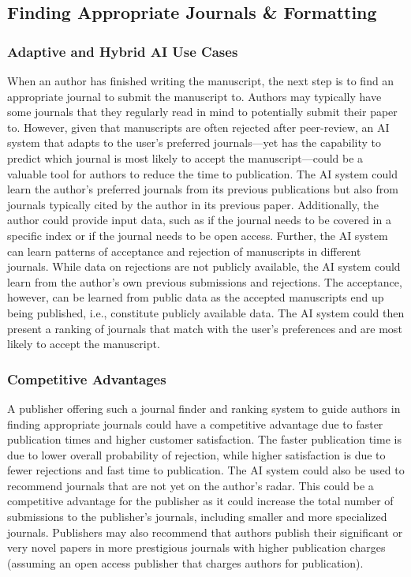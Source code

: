 \subsection{Finding Appropriate Journals \& Formatting}

\subsubsection*{Adaptive and Hybrid AI Use Cases}

When an author has finished writing the manuscript, the next step is to find an appropriate journal to submit the manuscript to.
Authors may typically have some journals that they regularly read in mind to potentially submit their paper to. However, given that 
manuscripts are often rejected after peer-review, an AI system that adapts to the user's preferred journals---yet has the capability 
to predict which journal is most likely to accept the manuscript---could be a valuable tool for authors to reduce the time to publication.
The AI system could learn the author's preferred journals from its previous publications but also from journals typically cited by the author
in its previous paper. Additionally, the author could provide input data, such as if the journal needs to be covered in a specific
index or if the journal needs to be open access. Further, the AI system can learn patterns of acceptance and rejection of manuscripts
in different journals. While data on rejections are not publicly available, the AI system could learn from the author's own previous
submissions and rejections. The acceptance, however, can be learned from public data as the accepted manuscripts end up being published, 
i.e., constitute publicly available data. The AI system could then present a ranking of journals that match with the user's preferences
and are most likely to accept the manuscript.

\subsubsection*{Competitive Advantages} 

A publisher offering such a journal finder and ranking system to guide authors in finding appropriate journals could have a competitive
advantage due to  faster publication times and higher customer satisfaction. The faster publication time is due to lower overall 
probability of rejection, while higher satisfaction is due to fewer rejections and fast time to publication. The AI system could also
be used to recommend journals that are not yet on the author's radar. This could be a competitive advantage for the publisher as it
could increase the total number of submissions to the publisher's journals, including smaller and more specialized journals. Publishers 
may also recommend that authors publish their significant or very novel papers in more prestigious journals with higher publication 
charges (assuming an open access publisher that charges authors for publication).

